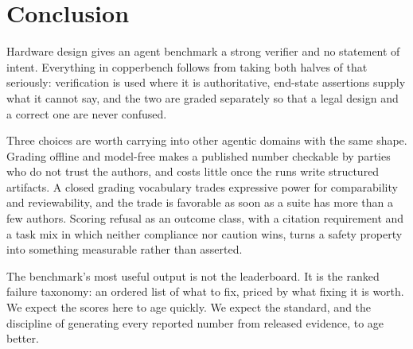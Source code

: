 \section{Conclusion}

Hardware design gives an agent benchmark a strong verifier and no statement of intent. Everything in copperbench follows from taking both halves of that seriously: verification is used where it is authoritative, end-state assertions supply what it cannot say, and the two are graded separately so that a legal design and a correct one are never confused.

Three choices are worth carrying into other agentic domains with the same shape. Grading offline and model-free makes a published number checkable by parties who do not trust the authors, and costs little once the runs write structured artifacts. A closed grading vocabulary trades expressive power for comparability and reviewability, and the trade is favorable as soon as a suite has more than a few authors. Scoring refusal as an outcome class, with a citation requirement and a task mix in which neither compliance nor caution wins, turns a safety property into something measurable rather than asserted.

The benchmark's most useful output is not the leaderboard. It is the ranked failure taxonomy: an ordered list of what to fix, priced by what fixing it is worth. We expect the scores here to age quickly. We expect the standard, and the discipline of generating every reported number from released evidence, to age better.
